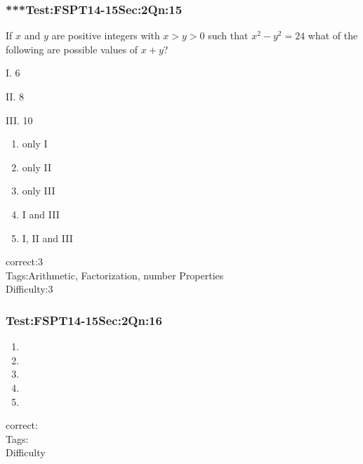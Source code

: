 \documentclass[]{beamer}
\begin{document}
    \begin{frame}
	    \frametitle{***Test:FSPT14-15\hspace{2mm}Sec:2\hspace{2mm}Qn:15}
	If $x$ and $y$ are positive integers with $x>y>0$ such that $x^2-y^2=24$ what of the following are possible values of $x+y$?\par
	I. 6\par
	II. 8\par
	III. 10\par	      
	    \begin{enumerate}
	        \item
	          	only I  	
	        \item
	            only II
	        \item
	            only III
	        \item
	            I and III
	        \item
	            I, II and III
	    \end{enumerate}
	    correct:3 \\   
	    Tags:Arithmetic, Factorization, number Properties    \\
	    Difficulty:3   \\
    \end{frame}
    \begin{frame}
	    \frametitle{Test:FSPT14-15\hspace{2mm}Sec:2\hspace{2mm}Qn:16}
	       
	    \begin{enumerate}
	        \item
	            	
	        \item
	            
	        \item
	            
	        \item
	            
	        \item
	            
	    \end{enumerate}
	    correct:  \\   
	    Tags:    \\
	    Difficulty   \\
    \end{frame}
\end{document}
